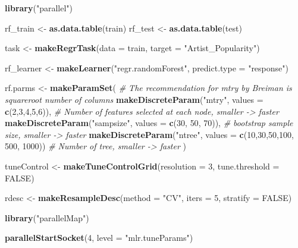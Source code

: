 \documentclass[
]{article}
\newenvironment{Shaded}{\begin{snugshade}}{\end{snugshade}}
\newcommand{\CommentTok}[1]{\textcolor[rgb]{0.56,0.35,0.01}{\textit{#1}}}
\newcommand{\DataTypeTok}[1]{\textcolor[rgb]{0.13,0.29,0.53}{#1}}
\newcommand{\DecValTok}[1]{\textcolor[rgb]{0.00,0.00,0.81}{#1}}
\newcommand{\KeywordTok}[1]{\textcolor[rgb]{0.13,0.29,0.53}{\textbf{#1}}}
\newcommand{\NormalTok}[1]{#1}
\newcommand{\OtherTok}[1]{\textcolor[rgb]{0.56,0.35,0.01}{#1}}
\newcommand{\StringTok}[1]{\textcolor[rgb]{0.31,0.60,0.02}{#1}}
\begin{document}
\begin{Shaded}
\begin{Highlighting}[]
\KeywordTok{library}\NormalTok{(}\StringTok{"parallel"}\NormalTok{)}

\NormalTok{rf_train <-}\StringTok{ }\KeywordTok{as.data.table}\NormalTok{(train)}
\NormalTok{rf_test <-}\StringTok{ }\KeywordTok{as.data.table}\NormalTok{(test)}

\NormalTok{task <-}\StringTok{ }\KeywordTok{makeRegrTask}\NormalTok{(}\DataTypeTok{data =}\NormalTok{ train, }\DataTypeTok{target =} \StringTok{"Artist_Popularity"}\NormalTok{)}

\NormalTok{rf_learner <-}\StringTok{ }\KeywordTok{makeLearner}\NormalTok{(}\StringTok{"regr.randomForest"}\NormalTok{, }
                          \DataTypeTok{predict.type =} \StringTok{"response"}\NormalTok{)}

\NormalTok{rf.parms <-}\StringTok{ }\KeywordTok{makeParamSet}\NormalTok{(}
  \CommentTok{# The recommendation for mtry by Breiman is squareroot number of columns}
  \KeywordTok{makeDiscreteParam}\NormalTok{(}\StringTok{"mtry"}\NormalTok{, }\DataTypeTok{values =} \KeywordTok{c}\NormalTok{(}\DecValTok{2}\NormalTok{,}\DecValTok{3}\NormalTok{,}\DecValTok{4}\NormalTok{,}\DecValTok{5}\NormalTok{,}\DecValTok{6}\NormalTok{)), }\CommentTok{# Number of features selected at each node, smaller -> faster}
  \KeywordTok{makeDiscreteParam}\NormalTok{(}\StringTok{"sampsize"}\NormalTok{, }\DataTypeTok{values =}  \KeywordTok{c}\NormalTok{(}\DecValTok{30}\NormalTok{, }\DecValTok{50}\NormalTok{, }\DecValTok{70}\NormalTok{)), }\CommentTok{# bootstrap sample size, smaller -> faster}
  \KeywordTok{makeDiscreteParam}\NormalTok{(}\StringTok{"ntree"}\NormalTok{, }\DataTypeTok{values =} \KeywordTok{c}\NormalTok{(}\DecValTok{10}\NormalTok{,}\DecValTok{30}\NormalTok{,}\DecValTok{50}\NormalTok{,}\DecValTok{100}\NormalTok{, }\DecValTok{500}\NormalTok{, }\DecValTok{1000}\NormalTok{)) }\CommentTok{# Number of tree, smaller -> faster}
\NormalTok{) }

\NormalTok{tuneControl <-}\StringTok{ }\KeywordTok{makeTuneControlGrid}\NormalTok{(}\DataTypeTok{resolution =} \DecValTok{3}\NormalTok{, }\DataTypeTok{tune.threshold =} \OtherTok{FALSE}\NormalTok{)}

\NormalTok{rdesc <-}\StringTok{ }\KeywordTok{makeResampleDesc}\NormalTok{(}\DataTypeTok{method =} \StringTok{"CV"}\NormalTok{, }\DataTypeTok{iters =} \DecValTok{5}\NormalTok{, }\DataTypeTok{stratify =} \OtherTok{FALSE}\NormalTok{)}

\KeywordTok{library}\NormalTok{(}\StringTok{"parallelMap"}\NormalTok{)}

\KeywordTok{parallelStartSocket}\NormalTok{(}\DecValTok{4}\NormalTok{, }\DataTypeTok{level =} \StringTok{"mlr.tuneParams"}\NormalTok{)}
\end{Highlighting}
\end{Shaded}
\end{document}
